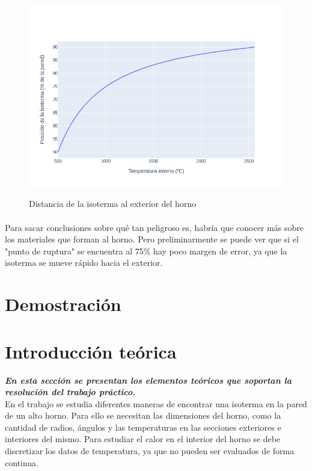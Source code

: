 \documentclass[12pt]{article}
\begin{document}
\begin{figure}[H]
\caption{Distancia de la isoterma al exterior del horno}
\centering
\includegraphics[width=\textwidth]{peligrosidad.distance}
\label{fig:peligrosidad.distance}
\end{figure}

\paragraph{} Para sacar conclusiones sobre qué tan peligroso es, habría que conocer más sobre los materiales que forman al horno. Pero preliminarmente se puede ver que si el "punto de ruptura" se encuentra al 75\% hay poco margen de error, ya que la isoterma se mueve rápido hacia el exterior.


\section{Demostración}

\section{Introducción teórica}


\textbf{\textit{En esta sección se presentan los elementos teóricos que soportan la resolución del trabajo práctico.}} 
\\

En el trabajo se estudia diferentes maneras de encontrar una isoterma en la pared de un alto horno. Para ello se necesitan las dimensiones del horno, como la cantidad de radios, ángulos y las temperaturas en las secciones exteriores e interiores del mismo. Para estudiar el calor en el interior del horno se debe discretizar los datos de temperatura, ya que no pueden ser evaluados de forma continua. 
\end{document}
